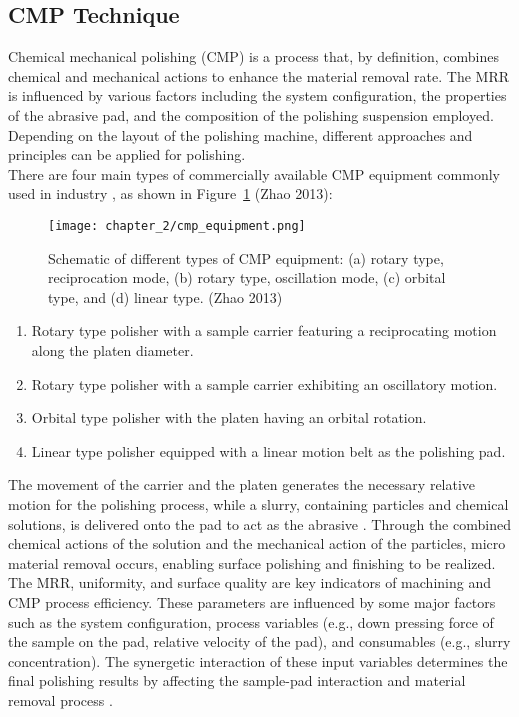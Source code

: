 \subsection{CMP Technique}
\label{subsec:cmp_technique}

Chemical mechanical polishing (CMP) is a process that, by definition, combines chemical and mechanical actions to enhance the material removal rate. The MRR is influenced by various factors including the system configuration, the properties of the abrasive pad, and the composition of the polishing suspension employed.
\\
Depending on the layout of the polishing machine, different approaches and principles can be applied for polishing.
\\
There are four main types of commercially available CMP equipment commonly used in industry \cite{zhaoChemicalMechanicalPolishing2013}, as shown in Figure~\ref{fig:cmp_equipment} (Zhao 2013): 
\begin{figure}[H]
    \centering
    \texttt{[image: chapter\_2/cmp\_equipment.png]}
    \caption[Schematic of different types of CMP equipment.]{ Schematic of different types of CMP equipment: (a) rotary type, reciprocation mode, (b) rotary type, oscillation mode, (c) orbital type, and (d) linear type. (Zhao 2013)}
    \label{fig:cmp_equipment}
\end{figure}
\begin{enumerate}
    \item Rotary type polisher with a sample carrier featuring a reciprocating motion along the platen diameter.
    \item Rotary type polisher with a sample carrier exhibiting an oscillatory motion.
    \item Orbital type polisher with the platen having an orbital rotation.
    \item Linear type polisher equipped with a linear motion belt as the polishing pad.
\end{enumerate}
The movement of the carrier and the platen generates the necessary relative motion for the polishing process, while a slurry, containing particles and chemical solutions, is delivered onto the pad to act as the abrasive \cite{zhaoChemicalMechanicalPolishing2013}. Through the combined chemical actions of the solution and the mechanical action of the particles, micro material removal occurs, enabling surface polishing and finishing to be realized.
\\
The MRR, uniformity, and surface quality are key indicators of machining and CMP process efficiency. These parameters are influenced by some major factors such as the system configuration, process variables (e.g., down pressing force of the sample on the pad, relative velocity of the pad), and consumables (e.g., slurry concentration). The synergetic interaction of these input variables determines the final polishing results by affecting the sample-pad interaction and material removal process \cite{kimEffectProcessConditions2004}. 

